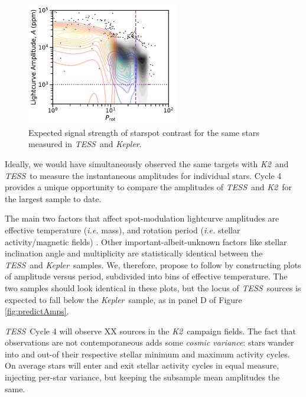 \documentclass[letterpaper,12pt]{article}
\newcommand{\tess}{{\it TESS}}
\newcommand{\kepler}{{\it Kepler}}
\newcommand{\ktwo}{{\it K2}}
\begin{document}
\begin{figure}
    \vspace{0mm}
    \begin{center}
    \includegraphics[width=2.6in]{figures/fig1.pdf}
    \caption{Expected signal strength of starspot contrast for the same stars measured in \tess\ and \kepler. }
    \label{fig:expected}
    \vspace{0mm}
\end{center}
\end{figure}


Ideally, we would have simultaneously observed the same targets with \ktwo\ and \tess\ to measure the instantaneous amplitudes for individual stars.  Cycle 4 provides a unique opportunity to compare the amplitudes of \tess\ and \ktwo\ for the largest sample to date.

The main two factors that affect spot-modulation lightcurve amplitudes are effective temperature (\emph{i.e.} mass), and rotation period (\emph{i.e.} stellar activity/magnetic fields) \cite{2014ApJS..211...24M}.  Other important-albeit-unknown factors like stellar inclination angle and multiplicity are statistically identical between the \tess\ and \kepler\ samples.  We, therefore, propose to follow \cite{2014ApJS..211...24M} by constructing plots of amplitude versus period, subdivided into bins of effective temperature.  The two samples should look identical in these plots, but the locus of \tess\ sources is expected to fall below the \kepler\ sample, as in panel D of Figure \ref{fig:predictAmps}.


\tess\ Cycle 4 will observe XX sources in the \ktwo\ campaign fields.  The fact that observations are not contemporaneous adds some \emph{cosmic variance}: stars wander into and out-of their respective stellar minimum and maximum activity cycles. On average stars will enter and exit stellar activity cycles in equal measure, injecting per-star variance, but keeping the subsample mean amplitudes the same.
\end{document}
